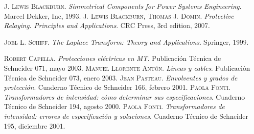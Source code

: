 \begin{thebibliography}{99}
     \textsc{J. Lewis Blackburn}. \textit{Simmetrical Components for Power Systems Engineering}.  Marcel Dekker, Inc, 1993.
     \textsc{J. Lewis Blackburn, Thomas J. Domin}. \textit{Protective Relaying. Principles and Applications}.  CRC Press, 3rd edition, 2007.


     \textsc{Joel L. Schiff}. \textit{The Laplace Transform: Theory and Applications}.  Springer, 1999.
    
     \textsc{Robert Capella}. \textit{Protecciones el\'{e}ctricas en MT}.  Publicaci\'{o}n T\'{e}cnica de Schneider 071, mayo 2003.
     \textsc{Manuel Llorente Ant\'{o}n}. \textit{L\'{\i}neas y cables}.  Publicaci\'{o}n T\'{e}cnica de Schneider 073, enero 2003.
     \textsc{Jean Pasteau}. \textit{Envolventes y grados de protecci\'{o}n}.  Cuaderno T\'{e}cnico de Schneider 166, febrero 2001.
     \textsc{Paola Fonti}. \textit{Transformadores de intensidad: c\'{o}mo determinar sus especificaciones}.  Cuaderno T\'{e}cnico de Schneider 194, agosto 2000.
     \textsc{Paola Fonti}. \textit{Transformadores de intensidad: errores de especificaci\'{o}n y soluciones}.  Cuaderno T\'{e}cnico de Schneider 195, diciembre 2001.
        
\end{thebibliography} 